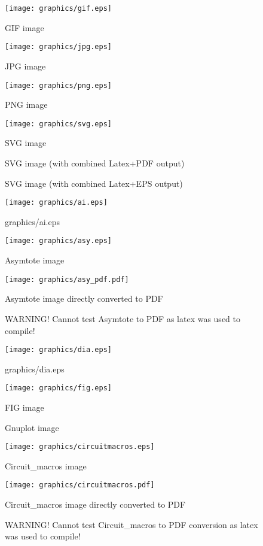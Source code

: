 \documentclass{scrartcl}
\begin{document}
\glsaddall
\begin{figure}
\texttt{[image: graphics/gif.eps]}
\caption{GIF image}
\end{figure}
\begin{figure}
\texttt{[image: graphics/jpg.eps]}
\caption{JPG image}
\end{figure}
\begin{figure}
\texttt{[image: graphics/png.eps]}
\caption{PNG image}
\end{figure}
\begin{figure}
\texttt{[image: graphics/svg.eps]}
\caption{SVG image}
\end{figure}
%
\begin{figure}
\ifpdf
	
	\caption{SVG image (with combined Latex+PDF output)}
\else
		
	\caption{SVG image (with combined Latex+EPS output)}
\fi
\end{figure}
%
\begin{figure}
\texttt{[image: graphics/ai.eps]}
\caption{graphics/ai.eps}
\end{figure}
\begin{figure}
\texttt{[image: graphics/asy.eps]}
\caption{Asymtote image}
\end{figure}
%
\begin{figure}
\ifpdf
	\texttt{[image: graphics/asy\_pdf.pdf]}
	\caption{Asymtote image directly converted to PDF}
\else
	\caption{WARNING! Cannot test Asymtote to PDF as latex was used to compile!}
\fi
\end{figure}
%
\begin{figure}
\texttt{[image: graphics/dia.eps]}
\caption{graphics/dia.eps}
\end{figure}
\begin{figure}
\texttt{[image: graphics/fig.eps]}
\caption{FIG image}
\end{figure}
\begin{figure}

\caption{Gnuplot image}
\end{figure}
\begin{figure}
\texttt{[image: graphics/circuitmacros.eps]}
\caption{Circuit\_macros image}
\end{figure}
\begin{figure}
\ifpdf
	\texttt{[image: graphics/circuitmacros.pdf]}
	\caption{Circuit\_macros image directly converted to PDF}
\else
	\caption{WARNING! Cannot test Circuit\_macros to PDF conversion as latex was used to compile!}
\fi
\end{figure}


\clearpage
\printglossaries
\end{document}
